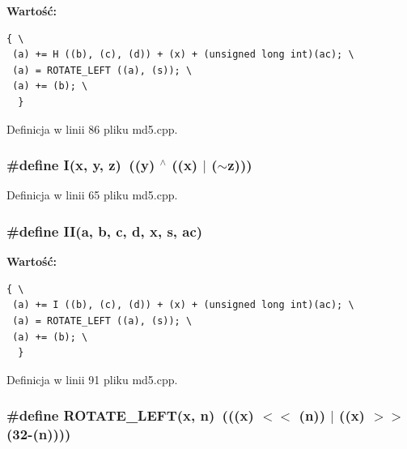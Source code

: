 \textbf{Wartość:}

\begin{Code}\begin{verbatim}{ \
 (a) += H ((b), (c), (d)) + (x) + (unsigned long int)(ac); \
 (a) = ROTATE_LEFT ((a), (s)); \
 (a) += (b); \
  }
\end{verbatim}
\end{Code}


Definicja w linii 86 pliku md5.cpp.\hypertarget{a00010_c0eafdc9ee161b71e7af98af736952fd}{
\subsubsection[{I}]{\setlength{\rightskip}{0pt plus 5cm}\#define I(x, \/  y, \/  z)~((y) $^\wedge$ ((x) $|$ ($\sim$z)))}}
\label{d7/dec/a00010_c0eafdc9ee161b71e7af98af736952fd}




Definicja w linii 65 pliku md5.cpp.\hypertarget{a00010_d26626e5efb37b2dadef4e88e35e4329}{
\subsubsection[{II}]{\setlength{\rightskip}{0pt plus 5cm}\#define II(a, \/  b, \/  c, \/  d, \/  x, \/  s, \/  ac)}}
\label{d7/dec/a00010_d26626e5efb37b2dadef4e88e35e4329}


\textbf{Wartość:}

\begin{Code}\begin{verbatim}{ \
 (a) += I ((b), (c), (d)) + (x) + (unsigned long int)(ac); \
 (a) = ROTATE_LEFT ((a), (s)); \
 (a) += (b); \
  }
\end{verbatim}
\end{Code}


Definicja w linii 91 pliku md5.cpp.\hypertarget{a00010_7417fd4e875360c0533fa5b412cdab49}{
\subsubsection[{ROTATE\_\-LEFT}]{\setlength{\rightskip}{0pt plus 5cm}\#define ROTATE\_\-LEFT(x, \/  n)~(((x) $<$$<$ (n)) $|$ ((x) $>$$>$ (32-(n))))}}
\label{d7/dec/a00010_7417fd4e875360c0533fa5b412cdab49}




